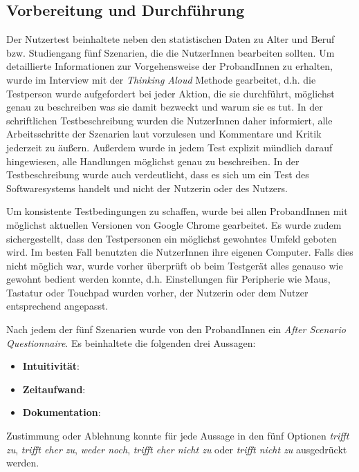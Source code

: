 \subsection{Vorbereitung und Durchführung}

Der Nutzertest beinhaltete neben den statistischen Daten zu Alter und Beruf bzw. Studiengang fünf Szenarien, die die NutzerInnen bearbeiten sollten. Um detaillierte Informationen zur Vorgehensweise der ProbandInnen zu erhalten, wurde im Interview mit der \textit{Thinking Aloud} Methode gearbeitet, d.h. die Testperson wurde aufgefordert bei jeder Aktion, die sie durchführt, möglichst genau zu beschreiben was sie damit bezweckt und warum sie es tut\cite{Nielsen1993}. In der schriftlichen Testbeschreibung wurden die NutzerInnen daher informiert, alle Arbeitsschritte der Szenarien laut vorzulesen und Kommentare und Kritik jederzeit zu äußern. Außerdem wurde in jedem Test explizit mündlich darauf hingewiesen, alle Handlungen möglichst genau zu beschreiben. In der Testbeschreibung wurde auch verdeutlicht, dass es sich um ein Test des Softwaresystems handelt und nicht der Nutzerin oder des Nutzers.

Um konsistente Testbedingungen zu schaffen, wurde bei allen ProbandInnen mit möglichst aktuellen Versionen von Google Chrome gearbeitet. Es wurde zudem sichergestellt, dass den Testpersonen ein möglichst gewohntes Umfeld geboten wird. Im besten Fall benutzten die NutzerInnen ihre eigenen Computer. Falls dies nicht möglich war, wurde vorher überprüft ob beim Testgerät alles genauso wie gewohnt bedient werden konnte, d.h. Einstellungen für Peripherie wie Maus, Tastatur oder Touchpad wurden vorher, der Nutzerin oder dem Nutzer entsprechend angepasst.

Nach jedem der fünf Szenarien wurde von den ProbandInnen ein \textit{After Scenario Questionnaire}\cite{Lewis1995}. Es beinhaltete die folgenden drei Aussagen:
\begin{itemize}
	\item \textbf{Intuitivität}: 
	\item \textbf{Zeitaufwand}: 
	\item \textbf{Dokumentation}: 
\end{itemize}

Zustimmung oder Ablehnung konnte für jede Aussage in den fünf Optionen \textit{trifft zu}, \textit{trifft eher zu}, \textit{weder noch}, \textit{trifft eher nicht zu} oder \textit{trifft nicht zu} ausgedrückt werden.


